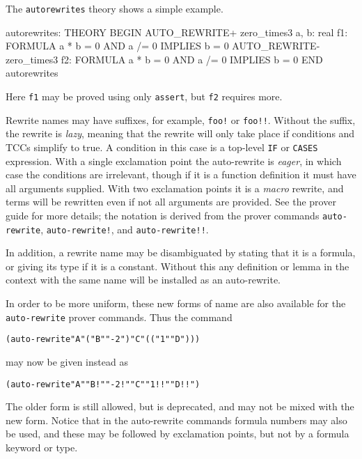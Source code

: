 The \texttt{autorewrites} theory shows a simple example.
\begin{session}
autorewrites: THEORY
BEGIN
 AUTO_REWRITE+ zero_times3
 a, b: real
 f1: FORMULA a * b = 0 AND a /= 0 IMPLIES b = 0
 AUTO_REWRITE- zero_times3
 f2: FORMULA a * b = 0 AND a /= 0 IMPLIES b = 0
END autorewrites
\end{session}
Here \texttt{f1} may be proved using only \texttt{assert}, but \texttt{f2}
requires more.

Rewrite names may have suffixes, for example, \texttt{foo!} or
\texttt{foo!!}.  Without the suffix, the rewrite is \emph{lazy}, meaning
that the rewrite will only take place if conditions and TCCs simplify to
true.  A condition in this case is a top-level \texttt{IF} or
\texttt{CASES} expression.  With a single exclamation point the
auto-rewrite is \emph{eager}, in which case the conditions are irrelevant,
though if it is a function definition it must have all arguments supplied.
With two exclamation points it is a \emph{macro} rewrite, and terms will
be rewritten even if not all arguments are provided.  See the prover guide
for more details; the notation is derived from the prover commands
\texttt{auto-rewrite}, \texttt{auto-rewrite!}, and
\texttt{auto-rewrite!!}.

In addition, a rewrite name may be disambiguated by stating that it is a
formula, or giving its type if it is a constant.  Without this any
definition or lemma in the context with the same name will be installed as
an auto-rewrite.

In order to be more uniform, these new forms of name are also available
for the \texttt{auto-rewrite} prover commands.  Thus the command
\begin{alltt}
  (auto-rewrite "A" ("B" "-2") "C" (("1" "D")))
\end{alltt}
may now be given instead as
\begin{alltt}
  (auto-rewrite "A" "B!" "-2!" "C" "1!!" "D!!")
\end{alltt}
The older form is still allowed, but is deprecated, and may not be mixed
with the new form.  Notice that in the auto-rewrite commands formula
numbers may also be used, and these may be followed by exclamation points,
but not by a formula keyword or type.

